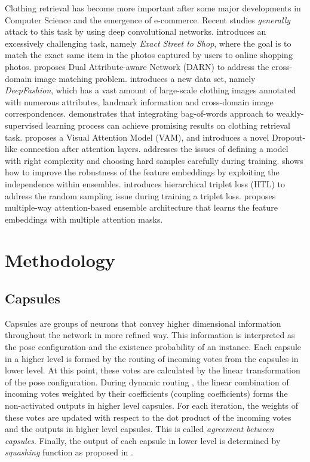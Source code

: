 \documentclass[10pt,twocolumn,letterpaper]{article}
\begin{document}
Clothing retrieval has become more important after some major developments in Computer Science and the emergence of e-commerce. Recent studies \textit{generally} attack to this task by using deep convolutional networks. \cite{wtbi} introduces an excessively challenging task, namely \textit{Exact  Street  to  Shop}, where the goal is to match the exact same item in the photos captured by users to online shopping photos. \cite{darn} proposes Dual Attribute-aware Network (DARN) to address the cross-domain image matching problem. \cite{deepfashion} introduces a new data set, namely \textit{DeepFashion}, which has a vast  amount  of  large-scale  clothing  images  annotated  with  numerous  attributes, landmark  information  and  cross-domain  image  correspondences. \cite{weakly-anno} demonstrates that integrating bag-of-words approach to weakly-supervised learning process can achieve promising results on clothing retrieval task. \cite{vam} proposes a Visual Attention Model (VAM), and introduces a novel Dropout-like connection after attention layers. \cite{hdc} addresses the issues of defining a model with right complexity and choosing hard samples carefully during training.  \cite{bier}  shows  how  to  improve  the  robustness  of  the  feature embeddings  by  exploiting  the  independence  within  ensembles. \cite{htl}  introduces  hierarchical  triplet  loss  (HTL)  to  address  the random  sampling  issue  during  training  a  triplet  loss. \cite{abe}  proposes  multiple-way  attention-based  ensemble  architecture that  learns  the  feature  embeddings  with  multiple  attention  masks.

\section{Methodology}

\subsection{Capsules}

Capsules are groups of neurons that convey higher dimensional information throughout the network in more refined way. This information is interpreted as the pose configuration and the existence probability of an instance. Each capsule in a higher level is formed by the routing of incoming votes from the capsules in lower level. At this point, these votes are calculated by the linear transformation of the pose configuration. During dynamic routing \cite{capsule}, the linear combination of incoming votes weighted by their coefficients (\ie coupling coefficients) forms the non-activated outputs in higher level capsules. For each iteration, the weights of these votes are updated with respect to the dot product of the incoming votes and the outputs in higher level capsules. This is called \textit{agreement between capsules}. Finally, the output of each capsule in lower level is determined by \textit{squashing} function as proposed in \cite{capsule}.
\end{document}
